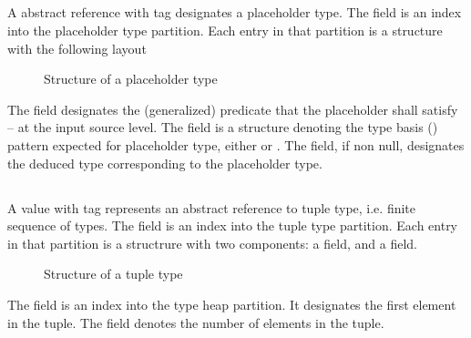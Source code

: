 \subsection{}
\label{sec:ifc:TypeSort:Placeholder}

A  abstract reference with tag 
 designates a placeholder type.
The  field is an index into the placeholder type partition.
Each entry in that partition is a structure with the following layout
%
\begin{figure}[H]
	\centering
	\caption{Structure of a placeholder type}
	\label{fig:ifc-placeholder-type-structure}
\end{figure}
%
The  field designates the (generalized) predicate that the placeholder
shall satisfy -- at the input source level.
The  field is a structure denoting the type basis
() pattern expected for placeholder type,
either  or .
The  field, if non null, designates the deduced type corresponding to the placeholder type.


\subsection{}
\label{sec:ifc:TypeSort:Tuple}

A  value with tag  represents
an abstract reference to tuple type, i.e. finite sequence of types.
The  field is an index into the tuple type partition.
Each entry in that partition is a structrure with two components: a  field,
and a  field.
%
\begin{figure}[H]
	\centering
	\caption{Structure of a tuple type}
	\label{fig:ifc-tuple-type-structure}
\end{figure}
%
The  field is an index into the type heap partition.  It designates the first element
in the tuple.
The  field denotes the number of elements in the tuple.


